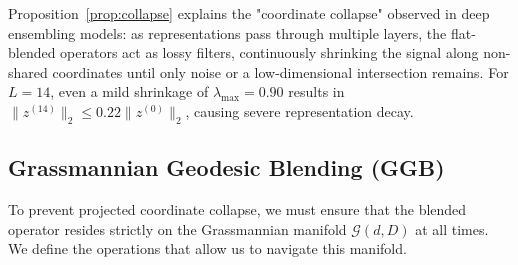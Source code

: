 Proposition~\ref{prop:collapse} explains the "coordinate collapse" observed in deep ensembling models: as representations pass through multiple layers, the flat-blended operators act as lossy filters, continuously shrinking the signal along non-shared coordinates until only noise or a low-dimensional intersection remains. For $L=14$, even a mild shrinkage of $\lambda_{\max} = 0.90$ results in $\|z^{(14)}\|_2 \leq 0.22 \|z^{(0)}\|_2$, causing severe representation decay.

\subsection{Grassmannian Geodesic Blending (GGB)}
To prevent projected coordinate collapse, we must ensure that the blended operator resides strictly on the Grassmannian manifold $\mathcal{G}(d, D)$ at all times. We define the operations that allow us to navigate this manifold.

